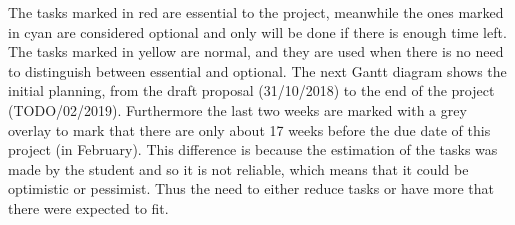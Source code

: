 \newcommand{\Frequirement}{2}

\newcommand{\Plen}{19} %

\newcommand{\Dlen}{0} %

\newcommand{\Cimportant}{red!70}
\newcommand{\Coptional}{cyan!30}
\newcommand{\Cnormal}{yellow!80}


The tasks marked in \colorbox{\Cimportant}{red} are essential to the project, meanwhile the ones marked in \colorbox{\Coptional}{cyan} are considered optional and only will be done if there is enough time left. The tasks marked in \colorbox{\Cnormal}{yellow} are normal, and they are used when there is no need to distinguish between essential and optional.
\linej
\linej
The next Gantt diagram shows the initial planning, from the draft proposal (31/10/2018) to the end of the project (TODO/02/2019).
\linej
Furthermore the last two weeks are marked with a grey overlay to mark that there are only about 17 weeks before the due date of this project (in February). This difference is because the estimation of the tasks was made by the student and so it is not reliable, which means that it could be optimistic or pessimist. Thus the need to either reduce tasks or have more that there were expected to fit.


